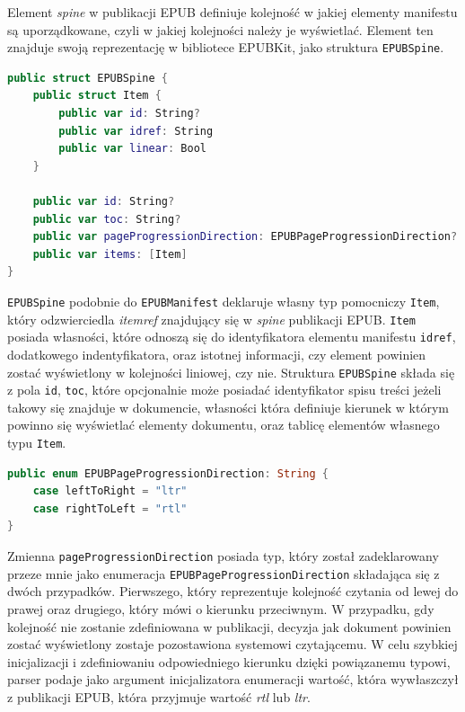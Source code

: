 Element \textit{spine} w publikacji EPUB definiuje kolejność w jakiej elementy manifestu są uporządkowane, czyli w jakiej kolejności należy je wyświetlać. Element ten znajduje swoją reprezentację w bibliotece EPUBKit, jako struktura \texttt{EPUBSpine}.

\begin{lstlisting}[caption={Struktura EPUBSpine}, language=swift,label=hntoofsda]
public struct EPUBSpine {
    public struct Item {
        public var id: String?
        public var idref: String
        public var linear: Bool
    }

    public var id: String?
    public var toc: String?
    public var pageProgressionDirection: EPUBPageProgressionDirection?
    public var items: [Item]
}
\end{lstlisting}

\texttt{EPUBSpine} podobnie do \texttt{EPUBManifest} deklaruje własny typ pomocniczy \texttt{Item}, który odzwierciedla \textit{itemref} znajdujący się w \textit{spine} publikacji EPUB. \texttt{Item} posiada własności, które odnoszą się do identyfikatora elementu manifestu \texttt{idref}, dodatkowego indentyfikatora, oraz istotnej informacji, czy element powinien zostać wyświetlony w kolejności liniowej, czy nie. Struktura \texttt{EPUBSpine} składa się z pola \texttt{id}, \texttt{toc}, które opcjonalnie może posiadać identyfikator spisu treści jeżeli takowy się znajduje w dokumencie, własności która definiuje kierunek w którym powinno się wyświetlać elementy dokumentu, oraz tablicę elementów własnego typu \texttt{Item}.

\begin{lstlisting}[language=swift,label=adag5yry,caption={}]
public enum EPUBPageProgressionDirection: String {
    case leftToRight = "ltr"
    case rightToLeft = "rtl"
}
\end{lstlisting}

Zmienna \texttt{pageProgressionDirection} posiada typ, który został zadeklarowany przeze mnie jako enumeracja \texttt{EPUBPageProgressionDirection} składająca się z dwóch przypadków. Pierwszego, który reprezentuje kolejność czytania od lewej do prawej oraz drugiego, który mówi o kierunku przeciwnym. W przypadku, gdy kolejność nie zostanie zdefiniowana w publikacji, decyzja jak dokument powinien zostać wyświetlony zostaje pozostawiona systemowi czytającemu. W celu szybkiej inicjalizacji i zdefiniowaniu odpowiedniego kierunku dzięki powiązanemu typowi, parser podaje jako argument inicjalizatora enumeracji wartość, która wywłaszczył z publikacji EPUB, która przyjmuje wartość \textit{rtl} lub \textit{ltr}.

